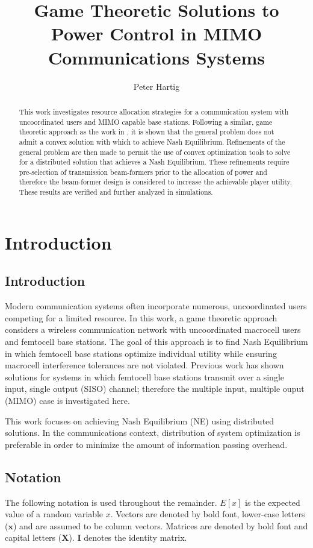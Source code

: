 \documentclass[12pt,a4paper]{report}
\title{Game Theoretic Solutions to Power Control in MIMO Communications Systems}
\author{Peter Hartig}
\begin{document}
\maketitle
\begin{abstract}
This work investigates resource allocation strategies for a communication system with uncoordinated users and MIMO capable base stations. Following a similar, game theoretic approach as the work in \cite{ghosh2015normalized}, it is shown that the general problem does not admit a convex solution with which to achieve Nash Equilibrium. Refinements of the general problem are then made to permit the use of convex optimization tools to solve for a distributed solution that achieves a Nash Equilibrium. These refinements require pre-selection of transmission beam-formers prior to the allocation of power and therefore the beam-former design is considered to increase the achievable player utility. These results are verified and further analyzed in simulations.
\end{abstract}
%
\tableofcontents


\chapter{Introduction}
\section{Introduction}
Modern communication systems often incorporate numerous, uncoordinated users competing for a limited resource.
In this work, a game theoretic approach considers a wireless communication network with uncoordinated macrocell users and femtocell base stations. The goal of this approach is to find Nash Equilibrium in which femtocell base stations optimize individual utility while ensuring macrocell interference tolerances are not violated. 
Previous work has shown solutions for systems in which femtocell base stations transmit over a single input, single output (SISO) channel; therefore the multiple input, multiple ouput (MIMO) case is investigated here. 
\par
This work focuses on achieving Nash Equilibrium (NE) using distributed solutions. In the communications context, distribution of system optimization is preferable in order to minimize the amount of information passing overhead. 


\section{Notation}
The following notation is used throughout the remainder. 
$E[x]$ is the expected value of a random variable $x$.
Vectors are denoted by bold font, lower-case letters ($\mathbf{x}$) and are assumed to be column vectors.
Matrices are denoted by bold font and capital letters ($\mathbf{X}$).
$\mathbf{I}$ denotes the identity matrix.
\end{document}
